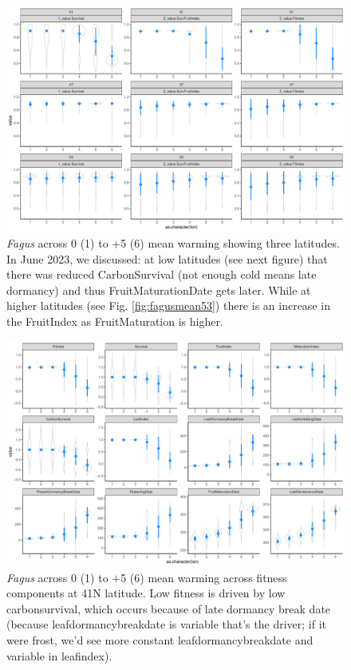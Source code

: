 \documentclass[11pt,letter]{article}
\begin{document}
\begin{figure} 
 \begin{center}
\noindent \includegraphics[width=1\textwidth]{..//analyses/graphs/phenofit/sims/metrics3/meansim_3metricsFS.pdf}
  \caption{\emph{Fagus} across 0 (1) to $+$5 (6) mean warming showing three latitudes. In June 2023, we discussed: at low latitudes (see next figure) that there was reduced CarbonSurvival (not enough cold means late dormancy) and thus FruitMaturationDate gets later. While at higher latitudes (see Fig. \ref{fig:fagusmean53}) there is an increase in the FruitIndex as FruitMaturation is higher.}
  \label{fig:fagusmean3}
  \end{center}
\end{figure}

\begin{figure} 
 \begin{center}
\noindent \includegraphics[width=1\textwidth]{..//analyses/graphs/phenofit/sims/meansim41_allmetricsFS.pdf}
  \caption{\emph{Fagus} across 0 (1) to $+$5 (6) mean warming across fitness components at 41\degree N latitude. Low fitness is driven by low carbonsurvival, which occurs because of late dormancy break date (because leafdormancybreakdate is variable that's the driver; if it were frost, we'd see more constant leafdormancybreakdate and variable in leafindex).}
  \label{fig:fagusmean41}
  \end{center}
\end{figure}
\end{document}
